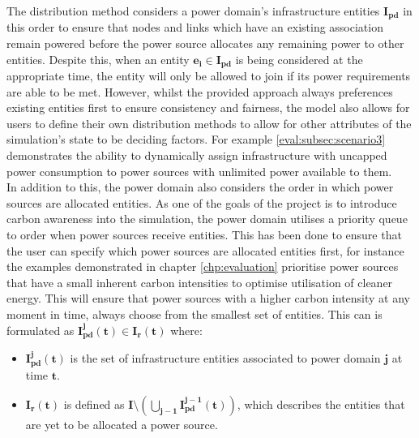 \documentclass{l4proj}
\begin{document}
The distribution method considers a power domain's infrastructure entities $\mathbf{I_{pd}}$ in this order to ensure that nodes and links which have an existing association remain powered before the power source allocates any remaining power to other entities.
Despite this, when an entity $\mathbf{e_{i} \in I_{pd}}$ is being considered at the appropriate time, the entity will only be allowed to join if its power requirements are able to be met.
However, whilst the provided approach always preferences existing entities first to ensure consistency and fairness, the model also allows for users to define their own distribution methods to allow for other attributes of the simulation's state to be deciding factors.
For example \ref{eval:subsec:scenario3} demonstrates the ability to dynamically assign infrastructure with uncapped power consumption to power sources with unlimited power available to them.\\

In addition to this, the power domain also considers the order in which power sources are allocated entities.
As one of the goals of the project is to introduce carbon awareness into the simulation, the power domain utilises a priority queue to order when power sources receive entities.
This has been done to ensure that the user can specify which power sources are allocated entities first, for instance the examples demonstrated in chapter \ref{chp:evaluation} prioritise power sources that have a small inherent carbon intensities to optimise utilisation of cleaner energy.
This will ensure that power sources with a higher carbon intensity at any moment in time, always choose from the smallest set of entities.
This can is formulated as $\mathbf{I_{pd}^j(t) \in I_{r}(t)}$ where:
\begin{itemize}
    \item $\mathbf{I_{pd}^j(t)}$ is the set of infrastructure entities associated to power domain $\mathbf{j}$ at time $\mathbf{t}$.\\
    \item $\mathbf{I_{r}(t)}$ is defined as $\mathbf{I \setminus \left( \bigcup_{j-1} I_{pd}^{j-1}(t) \right)}$, which describes the entities that are yet to be allocated a power source.
\end{itemize}
\end{document}
